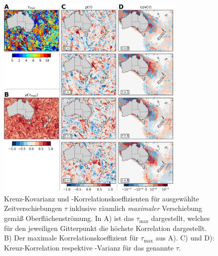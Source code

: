 \documentclass[12pt,a4paper,onecolumn]{scrartcl}
\begin{document}
\begin{figure}[!htb]
\centering
\includegraphics[width=0.8\textwidth]{bilder/correlation_selection.png}
\caption{Kreuz-Kovarianz und -Korrelationskoeffizienten für ausgewählte Zeitverschiebungen $\tau$ inklusive räumlich \textit{maximaler} Verschiebung gemäß Oberflächenströmung. In A) ist das $\tau_\text{max}$ dargestellt, welches für den jeweiligen Gitterpunkt die höchste Korrelation dargestellt. B) Der maximale Korrelationskoeffizient für $\tau_\text{max}$ aus A). C) und D): Kreuz-Korrelation respektive -Varianz für das genannte $\tau$.} \label{fig:correlation_selection}
\end{figure}
\end{document}
